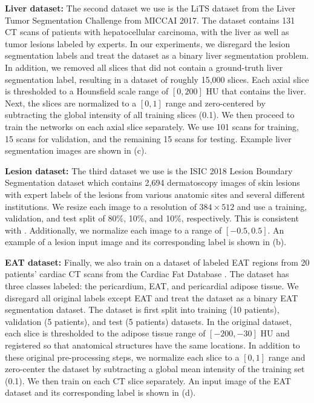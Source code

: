 \textbf{Liver dataset:} The second dataset we use is the LiTS dataset \cite{bilicLiverTumorSegmentation2019} from the Liver Tumor Segmentation Challenge from MICCAI 2017. The dataset contains 131 CT scans of patients with hepatocellular carcinoma, with the liver as well as tumor lesions labeled by experts. In our experiments, we disregard the lesion segmentation labels and treat the dataset as a binary liver segmentation problem. In addition, we removed all slices that did not contain a ground-truth liver segmentation label, resulting in a dataset of roughly 15,000 slices. Each axial slice is thresholded to a Hounsfield scale range of $[0, 200]$ HU that contains the liver. Next, the slices are normalized to a $[0, 1]$ range and zero-centered by subtracting the global intensity of all training slices (0.1). We then proceed to train the networks on each axial slice separately. We use 101 scans for training, 15 scans for validation, and the remaining 15 scans for testing. Example liver segmentation images are shown in (c).

\textbf{Lesion dataset:} The third dataset we use is the ISIC 2018 Lesion Boundary Segmentation dataset 
\cite{codellaSkinLesionAnalysis2018, tschandlHAM10000DatasetLarge2018} which contains 2,694 dermatoscopy 
images of skin lesions with expert labels of the lesions from various anatomic sites and several different 
institutions. We resize each image to a 
resolution of $384 \times 512$ and use a training, validation, and test split of 80\%, 10\%, and 10\%, 
respectively. This is consistent with \cite{jhaDoubleUNetDeepConvolutional2020}. Additionally, we normalize 
each image to a range of $[-0.5, 0.5]$. An example of a lesion 
input image and its corresponding label is shown in (b).

\textbf{EAT dataset:} Finally, we also train on a dataset of labeled EAT regions from 20 patients' cardiac CT scans from 
the Cardiac Fat Database \cite{rodriguesNovelApproachAutomated2016}. The dataset has three classes labeled: 
the pericardium, EAT, and pericardial adipose tissue. We disregard all original labels except EAT and treat the dataset as a binary EAT segmentation dataset. The dataset is 
first split into training (10 patients), validation (5 patients), and test (5 patients) datasets. In the 
original dataset, 
each slice is thresholded to the adipose tissue range of $[-200, -30]$ HU and registered so that anatomical 
structures have the same locations. In addition to these original pre-processing steps, we normalize each 
slice to a $[0, 1]$ range and zero-center 
the dataset by subtracting a global mean intensity of the training set (0.1). We then train on 
each CT slice separately. An input image of the EAT dataset and its corresponding label is shown in 
(d).

